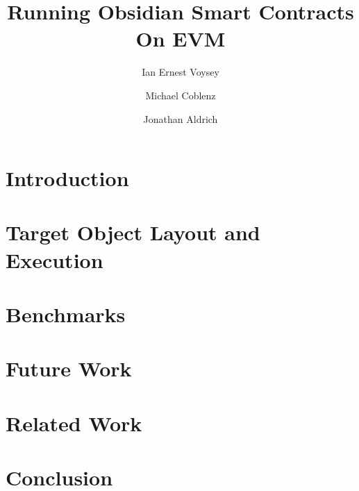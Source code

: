 \documentclass[sigplan,review,screen]{acmart}
\begin{document}
\title{Running Obsidian Smart Contracts On EVM}

\author{Ian Ernest Voysey}
\cmu{}

\author{Michael Coblenz}

\author{Jonathan Aldrich}
\cmu{}

\maketitle

\section{Introduction}\label{sec:intro}


\section{Target Object Layout and Execution}\label{sec:layout}


\section{Benchmarks}\label{sec:benchmarks}


\section{Future Work}\label{sec:futurework}


\section{Related Work}\label{sec:relatedwork}


\section{Conclusion}\label{sec:conclusion}

\end{document}
